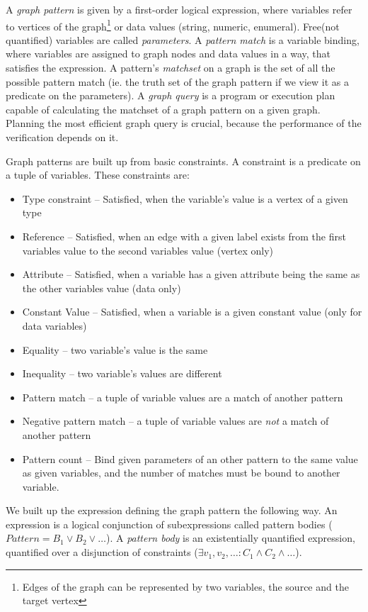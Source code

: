 A \emph{graph pattern} is given by a first-order logical expression, where variables refer to vertices of the graph\footnote{Edges of the graph can be represented by two variables, the source and the target vertex} or data values (string, numeric, enumeral).
Free(not quantified) variables are called \emph{parameters}.  
A \emph{pattern match} is a variable binding, where variables are assigned to graph nodes and data values in a way, that satisfies the expression.
A pattern's \emph{matchset} on a graph is the set of all the possible pattern match (ie. the truth set of the graph pattern if we view it as a predicate on the parameters).
A \emph{graph query} is a program or execution plan capable of calculating the matchset of a graph pattern on a given graph. 
Planning the most efficient graph query is crucial, because the performance of the verification depends on it.

Graph patterns are built up from basic constraints. 
A constraint is a predicate on a tuple of variables. 
These constraints are: 

\begin{itemize}
	\item Type constraint -- Satisfied, when the variable's value is a vertex of a given type
	\item Reference -- Satisfied, when an edge with a given label exists from the first variables value to the second variables value (vertex only)
	\item Attribute -- Satisfied, when a variable has a given attribute being the same as the other variables value (data only)
	\item Constant Value -- Satisfied, when a variable is a given constant value (only for data variables)
	\item Equality -- two variable's value is the same
	\item Inequality -- two variable's values are different
	\item Pattern match -- a tuple of variable values are a match of another pattern	
	\item Negative pattern match -- a tuple of variable values are \emph{not} a match of another pattern
	\item Pattern count -- Bind given parameters of an other pattern to the same value as given variables, and the number of matches must be bound to another variable.
\end{itemize}


We built up the expression defining the graph pattern the following way. 
An expression is a logical conjunction of subexpressions called pattern bodies ($Pattern = B_1 \vee B_2 \vee \dots$). 
A \emph{pattern body} is an existentially quantified expression, quantified over a disjunction of constraints ($\exists{} v_1, v_2, \dots : C_1 \wedge{} C_2 \wedge \dots$).

